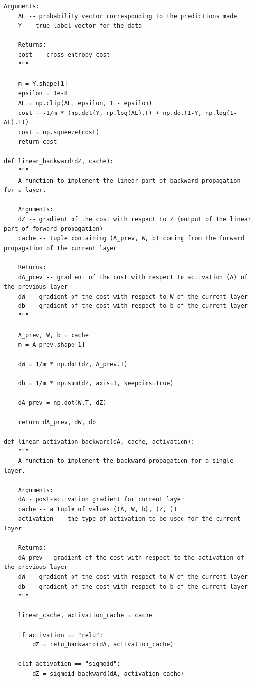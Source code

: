 \documentclass{article}
\begin{document}
\begin{lstlisting}[caption={Neural network functions - NN\_helper\_functions.py}]
    Arguments:
    AL -- probability vector corresponding to the predictions made
    Y -- true label vector for the data

    Returns:
    cost -- cross-entropy cost
    """

    m = Y.shape[1]
    epsilon = 1e-8
    AL = np.clip(AL, epsilon, 1 - epsilon)
    cost = -1/m * (np.dot(Y, np.log(AL).T) + np.dot(1-Y, np.log(1-AL).T))
    cost = np.squeeze(cost)
    return cost

def linear_backward(dZ, cache):
    """
    A function to implement the linear part of backward propagation for a layer.

    Arguments:
    dZ -- gradient of the cost with respect to Z (output of the linear part of forward propagation)
    cache -- tuple containing (A_prev, W, b) coming from the forward propagation of the current layer

    Returns:
    dA_prev -- gradient of the cost with respect to activation (A) of the previous layer
    dW -- gradient of the cost with respect to W of the current layer
    db -- gradient of the cost with respect to b of the current layer
    """

    A_prev, W, b = cache
    m = A_prev.shape[1]

    dW = 1/m * np.dot(dZ, A_prev.T)

    db = 1/m * np.sum(dZ, axis=1, keepdims=True)

    dA_prev = np.dot(W.T, dZ)

    return dA_prev, dW, db

def linear_activation_backward(dA, cache, activation):
    """
    A function to implement the backward propagation for a single layer.

    Arguments:
    dA - post-activation gradient for current layer
    cache -- a tuple of values ((A, W, b), (Z, ))
    activation -- the type of activation to be used for the current layer

    Returns:
    dA_prev - gradient of the cost with respect to the activation of the previous layer
    dW -- gradient of the cost with respect to W of the current layer
    db -- gradient of the cost with respect to b of the current layer
    """

    linear_cache, activation_cache = cache

    if activation == "relu":
        dZ = relu_backward(dA, activation_cache)
    
    elif activation == "sigmoid":
        dZ = sigmoid_backward(dA, activation_cache)
    

\end{lstlisting}
\end{document}
